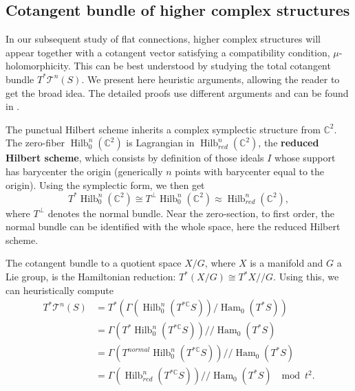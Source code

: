 \documentclass[11pt]{amsart}
\numberwithin{thm}{section} %
\numberwithin{equation}{section} %
\numberwithin{figure}{section} %
\newcommand*{\R}{\mathbb{R}}
\newcommand*{\C}{\mathbb{C}}
\renewcommand*{\S}{S}
\newcommand*{\mc}{\mathcal}
\newcommand*{\cotang}{T^*\mc{T}^n(S)}
\newcommand*{\T}{\mc{T}}
\DeclareMathOperator{\Hilb}{Hilb}
\DeclareMathOperator{\Ham}{Ham}
\DeclareMathOperator{\PSL}{PSL}
\begin{document}


\subsection{Cotangent bundle of higher complex structures}\label{cotangs}

In our subsequent study of flat connections, higher complex structures will appear together with a cotangent vector satisfying a compatibility condition, $\mu$-holomorphicity. This can be best understood by studying the total cotangent bundle $\cotang$. We present here heuristic arguments, allowing the reader to get the broad idea. The detailed proofs use different arguments and can be found in \cite{FockThomas, Nolte}.

The punctual Hilbert scheme inherits a complex symplectic structure from $\C^2$. The zero-fiber $\Hilb^n_0(\C^2)$ is Lagrangian in $\Hilb^n_{red}(\C^2)$, the \textbf{reduced Hilbert scheme}, which consists by definition of those ideals $I$ whose support has barycenter the origin (generically $n$ points with barycenter equal to the origin).
Using the symplectic form, we then get $$T^*\Hilb^n_0(\C^2)\cong T^{\perp}\Hilb^n_{0}(\C^2) \approx \Hilb^n_{red}(\C^2),$$ where $T^{\perp}$ denotes the normal bundle. Near the zero-section, to first order, the normal bundle can be identified with the whole space, here the reduced Hilbert scheme.

The cotangent bundle to a quotient space $X/G$, where $X$ is a manifold and $G$ a Lie group, is the Hamiltonian reduction: $T^*(X/G) \cong T^*X//G$. Using this, we can heuristically compute
\begin{align}
\cotang &= T^*\left(\Gamma(\Hilb^n_0(T^{*\mathbb{C}}S))/\Ham_0(T^*S)\right)  \nonumber \\
&= \Gamma(T^*\Hilb^n_0(T^{*\mathbb{C}}S)) // \Ham_0(T^*S)  \nonumber \\
&= \Gamma(T^{normal}\Hilb^n_0(T^{*\mathbb{C}}S))// \Ham_0(T^*S)  \nonumber \\
&= \Gamma(\Hilb^n_{red}(T^{*\mathbb{C}}S)) // \Ham_0(T^*S) \; \mod t^2. \label{hkquotientofmodulispace}
\end{align}
\end{document}
